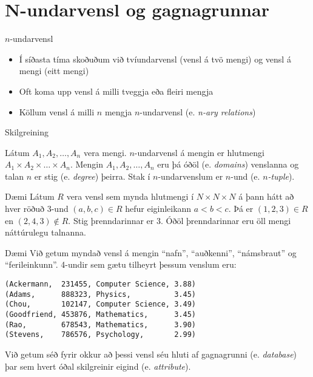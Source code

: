 \documentclass[handout]{beamer}
\begin{document}
\section{N-undarvensl og gagnagrunnar}

\begin{frame}{$n$-undarvensl}
    \begin{itemize}
        \item Í síðasta tíma skoðuðum við tvíundarvensl (vensl á tvö mengi) og vensl á mengi (eitt mengi)
        \item Oft koma upp vensl á milli tveggja eða fleiri mengja
        \item Köllum vensl á milli $n$ mengja $n$-undarvensl (e. \emph{n-ary relations})
    \end{itemize}
\end{frame}

\begin{frame}{Skilgreining}
\begin{tcolorbox}[title=n-undarvensl]
Látum $A_1, A_2, \ldots, A_n$ vera mengi. $n$-undarvensl á mengin er hlutmengi $A_1 \times A_2 \times \ldots \times A_n$. Mengin $A_1, A_2, \ldots, A_n$ eru þá óðöl (e. \emph{domains}) venslanna og talan $n$ er stig (e. \emph{degree}) þeirra. Stak í $n$-undarvenslum er $n$-und (e. \emph{$n$-tuple}).
\end{tcolorbox}
\end{frame}

\begin{frame}{Dæmi}
Látum $R$ vera vensl sem mynda hlutmengi í $N \times N \times N$ á þann hátt að hver röðuð 3-und $(a, b, c) \in R$ hefur eiginleikann $a < b < c$. Þá er $(1, 2, 3) \in R$ en $(2, 4, 3) \notin R$. Stig þrenndarinnar er 3. Óðöl þrenndarinnar eru öll mengi náttúrulegu talnanna.
\end{frame}

\begin{frame}[fragile]{Dæmi}
Við getum myndað vensl á mengin ``nafn'', ``auðkenni'', ``námsbraut'' og ``ferileinkunn''. 4-undir sem gætu tilheyrt þessum venslum eru:

\begin{verbatim}
(Ackermann,  231455, Computer Science, 3.88)
(Adams,      888323, Physics,          3.45)
(Chou,       102147, Computer Science, 3.49)
(Goodfriend, 453876, Mathematics,      3.45)
(Rao,        678543, Mathematics,      3.90)
(Stevens,    786576, Psychology,       2.99)
\end{verbatim}
Við getum séð fyrir okkur að þessi vensl séu hluti af gagnagrunni (e. \emph{database}) þar sem hvert óðal skilgreinir eigind (e. \emph{attribute}). 
\end{frame}
\end{document}
